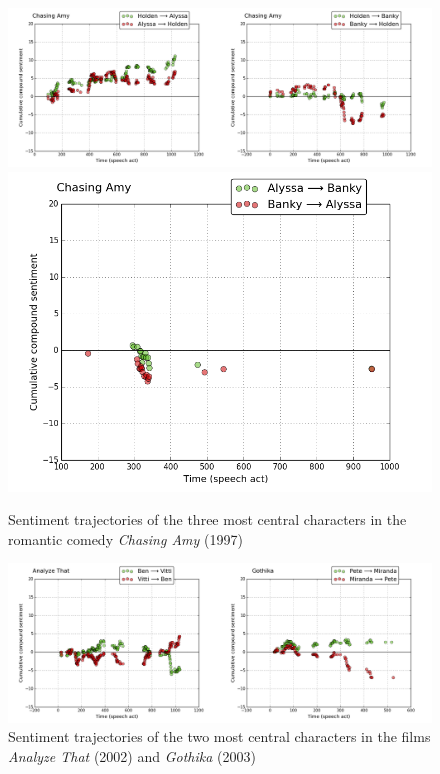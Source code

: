 \documentclass[bsc,frontabs,singlespacing,parskip, twoside]{infthesis}
\begin{document}
\begin{figure}[h!]
\begin{adjustwidth}{-0.5in}{-0.5in}
	\centering
		\includegraphics[scale=0.43]{figures/chasing_amy1}
		\includegraphics[scale=0.43]{figures/chasing_amy2}
	\caption{Sentiment trajectories of the three most central characters in the romantic comedy 
\textit{Chasing Amy} (1997)}
	\label{fig:chasing_amy}
\end{adjustwidth}
\end{figure}

\begin{figure}[h!]
\begin{adjustwidth}{-0.5in}{-0.5in}
	\centering
	\includegraphics[scale=0.43]{figures/y_contradictions}
	\caption{Sentiment trajectories of the two most central characters in the films \textit{Analyze That} (2002) and \textit{Gothika} (2003)}
	\label{fig:contradictions}
\end{adjustwidth}
\end{figure}
\end{document}
